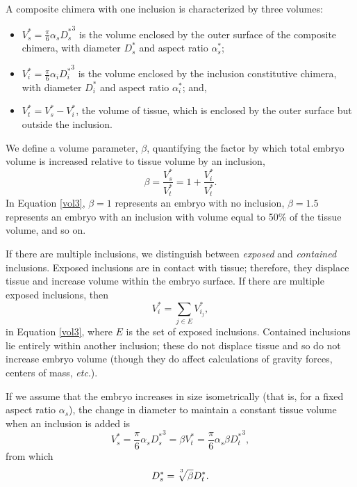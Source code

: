 \documentclass[10pt,a4paper]{article}
\def\etc{\emph{etc}.\xspace}
\begin{document}
A composite chimera with one inclusion is characterized by three volumes:
\begin{itemize}
	\item $V_s^* = \frac{\pi}{6} \alpha_s {D_s^*}^3$ is the volume enclosed by the outer surface of the composite chimera, with diameter $D_s^*$ and aspect ratio $\alpha_s^*$;
	\item $V_i^* = \frac{\pi}{6} \alpha_i {D_i^*}^3$ is the volume enclosed by the inclusion constitutive chimera, with diameter $D_i^*$ and aspect ratio $\alpha_i^*$; and,
	\item $V_t^* = V_s^* - V_i^*$, the volume of tissue, which is enclosed by the outer surface but outside the inclusion. 
\end{itemize}
We define a volume parameter, $\beta$, quantifying the factor by which total embryo volume is increased relative to tissue volume by an inclusion,
\begin{equation}\label{vol3}
	\beta = \frac{V_s^*}{V_t^*} = 1 + \frac{V_i^*}{V_t^*}.
\end{equation}
In Equation \ref{vol3}, $\beta = 1$ represents an embryo with no inclusion, $\beta = 1.5$ represents an embryo with an inclusion with volume equal to 50\% of the tissue volume, and so on.

If there are multiple inclusions, we distinguish between \textit{exposed} and \textit{contained} inclusions. 
Exposed inclusions are in contact with tissue; therefore, they displace tissue and increase volume within the embryo surface.  
If there are multiple exposed inclusions, then 
\begin{equation}\label{eqn:expincl}
	V_i^* = \sum_{j \in E} V^*_{i_j},
\end{equation}
in  Equation \ref{vol3}, where $E$ is the set of exposed inclusions.
Contained inclusions lie entirely within another inclusion; these do not displace tissue and so do not increase embryo volume (though they do affect calculations of gravity forces, centers of mass, \etc).


If we assume that the embryo increases in size isometrically (that is, for a fixed aspect ratio $\alpha_s$), the change in diameter to maintain a constant tissue volume when an inclusion is added is
\begin{equation}\label{vol4}
	V_s^*  = \frac{\pi}{6} \alpha_s {D_s^*}^3 = \beta V_t^* = \frac{\pi}{6} \alpha_s \beta {D_t^*}^3,
\end{equation} 
from which 
\begin{equation}\label{vol5}
	D_s^* = \sqrt[\uproot{5}3]{\beta} D_t^*.
\end{equation}
\end{document}

